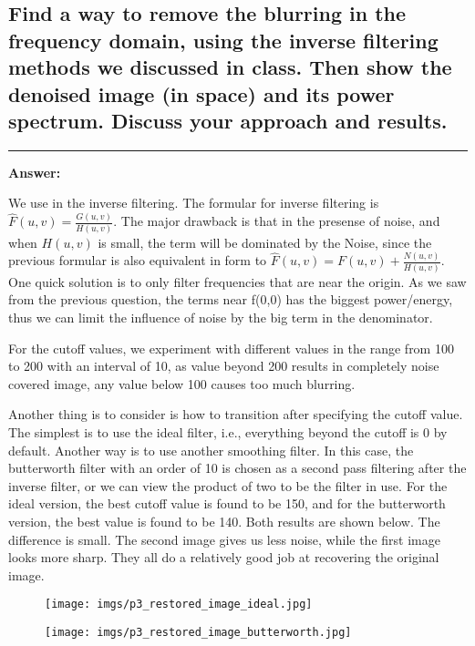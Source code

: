 \documentclass[conference]{styles/acmsiggraph}
\newenvironment{answer}{}{}
\begin{document}
\subsection{Find a way to remove the blurring in the frequency domain, using the inverse filtering methods we
discussed in class. Then show the denoised image (in space) and its power spectrum. Discuss your
approach and results.}
\begin{answer}
	\rule{\textwidth}{0.4pt}
	\textbf{Answer:}	

	We use in the inverse filtering. The formular for inverse filtering is $\hat{F}(u,v) = \frac{G(u,v)}{H(u,v)}$. The major drawback is that in the presense of noise, and when $H(u,v)$ is small, the term will be dominated by the Noise, since the previous formular is also equivalent in form to $\hat{F}(u,v) = F(u,v) + \frac{N(u,v)}{H(u,v)}$. One quick solution is to only filter frequencies that are near the origin. As we saw from the previous question, the terms near f(0,0) has the biggest power/energy, thus we can limit the influence of noise by the big term in the denominator. 

	For the cutoff values, we experiment with different values in the range from 100 to 200 with an interval of 10, as value beyond 200 results in completely noise covered image, any value below 100 causes too much blurring. 
	
	Another thing is to consider is how to transition after specifying the cutoff value. The simplest is to use the ideal filter, i.e., everything beyond the cutoff is 0 by default. Another way is to use another smoothing filter. In this case, the butterworth filter with an order of 10 is chosen as a second pass filtering after the inverse filter, or we can view the product of two to be the filter in use. For the ideal version, the best cutoff value is found to be 150, and for the butterworth version, the best value is found to be 140. Both results are shown below. The difference is small. The second image gives us less noise, while the first image looks more sharp. They all do a relatively good job at recovering the original image.
	\begin{figure}[H]
		\centering
		\texttt{[image: imgs/p3\_restored\_image\_ideal.jpg]}
		\end{figure}	
		
		\begin{figure}[H]
			\centering
			\texttt{[image: imgs/p3\_restored\_image\_butterworth.jpg]}
		\end{figure}	
		

\end{answer}
\end{document}
